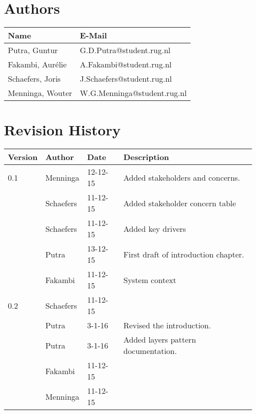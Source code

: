 \section*{Authors}

\begin{tabular}{L{} L{}}
	\textbf{Name}        & \textbf{E-Mail}               \\ \toprule
	Putra, Guntur        & G.D.Putra@student.rug.nl      \\
	Fakambi, Aur\'{e}lie & A.Fakambi@student.rug.nl      \\
	Schaefers, Joris     & J.Schaefers@student.rug.nl    \\
	Menninga, Wouter     & W.G.Menninga@student.rug.nl   \\ 
\end{tabular}

\section*{Revision History}
\begin{longtable}{L{} L{} L{} L{}}
	\textbf{Version} & \textbf{Author}       & \textbf{Date} & \textbf{Description}                                                                                                                                                                                                       \\ \endhead	\toprule
				0.1 & Menninga  & 12-12-15 & Added stakeholders and concerns. \\
					& Schaefers & 11-12-15 & Added stakeholder concern table\\
					& Schaefers & 11-12-15 & Added key drivers\\
					& Putra		& 13-12-15 & First draft of introduction chapter. \\
					& Fakambi   & 11-12-15 & System context\\
				\midrule
			
				0.2 & Schaefers & 11-12-15 & \\
					& Putra		& 3-1-16 & Revised the introduction. \\
					& Putra		& 3-1-16 & Added layers pattern documentation. \\
					& Fakambi   & 11-12-15 & \\
					& Menninga  & 11-12-15 & \\
				\midrule

%			
\end{longtable}